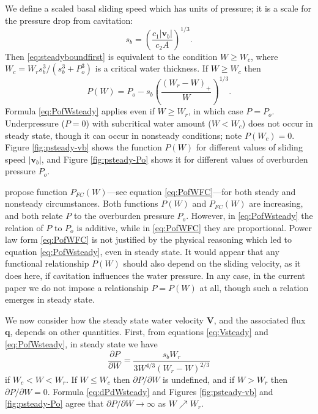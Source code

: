\documentclass[gmd]{copernicus}   %
\newcommand\bv{\mathbf{v}}
\newcommand\bV{\mathbf{V}}
\newcommand\bq{\mathbf{q}}
\begin{document}
We define a scaled basal sliding speed which has units of pressure; it is a scale for the pressure drop from cavitation:
\begin{equation}
s_b =  \left(\frac{c_1 |\bv_b|}{c_2 A}\right)^{1/3}.  \label{eq:definesb}
\end{equation}
Then \eqref{eq:steadyboundfirst} is equivalent to the condition $W\ge W_c$, where $W_c = W_r s_b^3/(s_b^3 + P_o^3)$ is a critical water thickness.  If $W\ge W_c$ then
\begin{equation}
P(W) = P_o - s_b \left(\frac{(W_r - W)_+}{W}\right)^{1/3}.  \label{eq:PofWsteady}
\end{equation}
Formula \eqref{eq:PofWsteady} applies even if $W\ge W_r$, in which case $P = P_o$.  Underpressure ($P=0$) with subcritical water amount ($W<W_c$) does not occur in steady state, though it can occur in nonsteady conditions; note $P(W_c)=0$.  Figure \ref{fig:psteady-vb} shows the function $P(W)$ for different values of sliding speed $|\bv_b|$, and Figure \ref{fig:psteady-Po} shows it for different values of overburden pressure $P_o$.

\cite{FlowersClarke2002_theory} propose function $P_{FC}(W)$---see equation \eqref{eq:PofWFC}---for both steady and nonsteady circumstances.  Both functions $P(W)$ and $P_{FC}(W)$ are increasing, and both relate $P$ to the overburden pressure $P_o$.  However, in \eqref{eq:PofWsteady} the relation of $P$ to $P_o$ is additive, while in \eqref{eq:PofWFC} they are proportional.  Power law form \eqref{eq:PofWFC} is not justified by the physical reasoning which led to equation \eqref{eq:PofWsteady}, even in steady state.   It would appear that any functional relationship $P(W)$ should also depend on the sliding velocity, as it does here, if cavitation influences the water pressure.  In any case, in the current paper we do not impose a relationship $P=P(W)$ at all, though such a relation emerges in steady state.

We now consider how the steady state water velocity $\bV$, and the associated flux $\bq$, depends on other quantities.  First, from equations \eqref{eq:Vsteady} and \eqref{eq:PofWsteady}, in steady state we have
\begin{equation}
\frac{\partial P}{\partial W} = \frac{s_b W_r}{3 W^{4/3} (W_r - W)^{2/3}} \label{eq:dPdWsteady}
\end{equation}
if $W_c < W < W_r$.  If $W\le W_c$ then $\partial P/\partial W$ is undefined, and if $W>W_r$ then $\partial P/\partial W=0$.  Formula \eqref{eq:dPdWsteady} and Figures \ref{fig:psteady-vb} and \ref{fig:psteady-Po} agree that $\partial P / \partial W \to \infty$ as $W \nearrow W_r$.  
\end{document}
